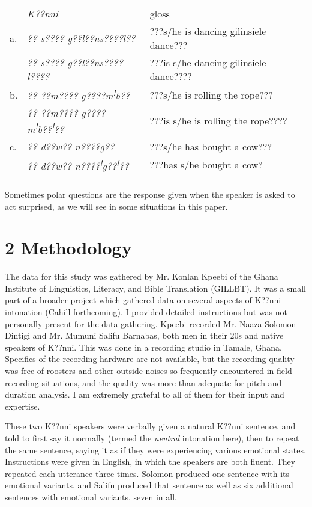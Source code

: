 \documentclass[output=paper]{langsci/langscibook}
\begin{document}
\begin{tabular}{lll} & \emph{K??nni } & gloss\\
\lsptoprule
a. & \emph{?? s???? g??l??ns????l??} & ???s/he is dancing gilinsiele dance???\\
& \emph{?? s???? g??l??ns????l????  } & ???is s/he dancing gilinsiele dance????\\
b. & \emph{?? ??m???? g????m}\textit{\textsuperscript{!}}\emph{b??} & ???s/he is rolling the rope???\\
& \emph{?? ??m???? g????m}\textit{\textsuperscript{!}}\emph{b??}\textit{\textsuperscript{!}}\emph{??} & ???is s/he is rolling the rope????\\
c. & \emph{?? d??w?? n????g??  } & ???s/he has bought a cow???\\
& \emph{?? d??w?? n????}\textit{\textsuperscript{!}}\emph{g??}\textit{\textsuperscript{!}}\emph{??  } & ???has s/he bought a cow?\\
\lspbottomrule
\end{tabular}
Sometimes polar questions are the response given when the speaker is asked to act surprised, as we will see in some situations in this paper. 

\section{2 Methodology}
\begin{styleBodyTextIndent}
The data for this study was gathered by Mr. Konlan Kpeebi of the Ghana Institute of Linguistics, Literacy, and Bible Translation (GILLBT). It was a small part of a broader project which gathered data on several aspects of K??nni intonation (Cahill forthcoming). I provided detailed instructions but was not personally present for the data gathering. Kpeebi recorded Mr. Naaza Solomon Dintigi and Mr. Mumuni Salifu Barnabas, both men in their 20s and native speakers of K??nni. This was done in a recording studio in Tamale, Ghana. Specifics of the recording hardware are not available, but the recording quality was free of roosters and other outside noises so frequently encountered in field recording situations, and the quality was more than adequate for pitch and duration analysis. I am extremely grateful to all of them for their input and expertise.
\end{styleBodyTextIndent}

These two K??nni speakers were verbally given a natural K??nni sentence, and told to first say it normally (termed the \emph{neutral} intonation here), then to repeat the same sentence, saying it as if they were experiencing various emotional states. Instructions were given in English, in which the speakers are both fluent. They repeated each utterance three times. Solomon produced one sentence with its emotional variants, and Salifu produced that sentence as well as six additional sentences with emotional variants, seven in all.
\end{document}
